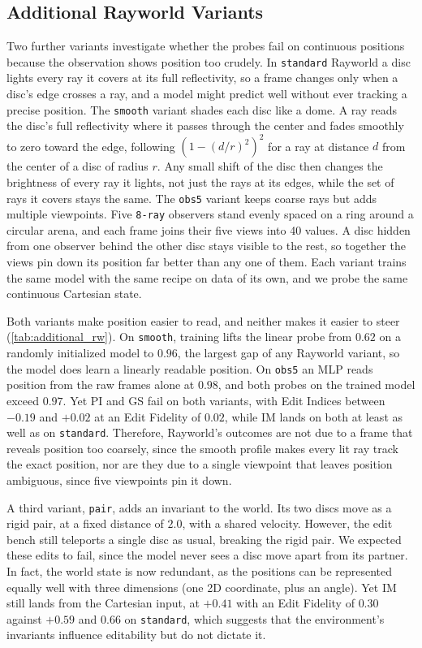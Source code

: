 \documentclass{article} %
\begin{document}
\FloatBarrier
\subsection{Additional Rayworld Variants}
\label{app:additional_rayworld_runs}

Two further variants investigate whether the probes fail on continuous positions because the observation shows position too crudely. In \texttt{standard} Rayworld a disc lights every ray it covers at its full reflectivity, so a frame changes only when a disc's edge crosses a ray, and a model might predict well without ever tracking a precise position. The \texttt{smooth} variant shades each disc like a dome. A ray reads the disc's full reflectivity where it passes through the center and fades smoothly to zero toward the edge, following $(1 - (d/r)^2)^2$ for a ray at distance $d$ from the center of a disc of radius $r$. Any small shift of the disc then changes the brightness of every ray it lights, not just the rays at its edges, while the set of rays it covers stays the same. The \texttt{obs5} variant keeps coarse rays but adds multiple viewpoints. Five \texttt{8-ray} observers stand evenly spaced on a ring around a circular arena, and each frame joins their five views into 40 values. A disc hidden from one observer behind the other disc stays visible to the rest, so together the views pin down its position far better than any one of them. Each variant trains the same model with the same recipe on data of its own, and we probe the same continuous Cartesian state.

Both variants make position easier to read, and neither makes it easier to steer (\cref{tab:additional_rw}). On \texttt{smooth}, training lifts the linear probe from $0.62$ on a randomly initialized model to $0.96$, the largest gap of any Rayworld variant, so the model does learn a linearly readable position. On \texttt{obs5} an MLP reads position from the raw frames alone at $0.98$, and both probes on the trained model exceed $0.97$. Yet PI and GS fail on both variants, with Edit Indices between $-0.19$ and $+0.02$ at an Edit Fidelity of $0.02$, while IM lands on both at least as well as on \texttt{standard}. Therefore, Rayworld's outcomes are not due to a frame that reveals position too coarsely, since the smooth profile makes every lit ray track the exact position, nor are they due to a single viewpoint that leaves position ambiguous, since five viewpoints pin it down.

A third variant, \texttt{pair}, adds an invariant to the world. Its two discs move as a rigid pair, at a fixed distance of $2.0$, with a shared velocity. However, the edit bench still teleports a single disc as usual, breaking the rigid pair. We expected these edits to fail, since the model never sees a disc move apart from its partner. In fact, the world state is now redundant, as the positions can be represented equally well with three dimensions (one 2D coordinate, plus an angle). Yet IM still lands from the Cartesian input, at $+0.41$ with an Edit Fidelity of $0.30$ against $+0.59$ and $0.66$ on \texttt{standard}, which suggests that the environment's invariants influence editability but do not dictate it.
\end{document}
